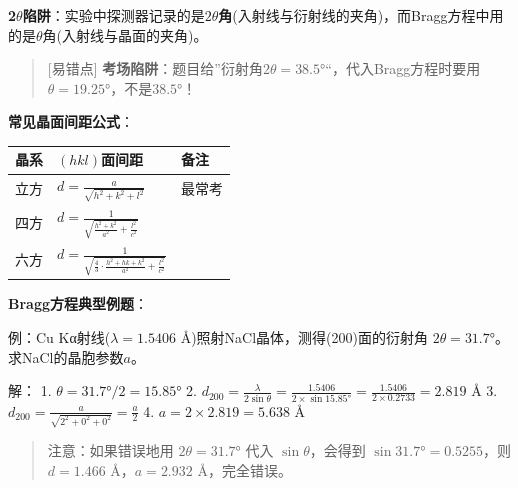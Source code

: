 \textbf{2\(\theta\)陷阱}：实验中探测器记录的是\textbf{\(2\theta\)角}(入射线与衍射线的夹角)，而Bragg方程中用的是\(\theta\)角(入射线与晶面的夹角)。

\begin{quote}
{[}易错点{]} \textbf{考场陷阱}：题目给''衍射角\(2\theta = 38.5°\)``，代入Bragg方程时要用\(\theta = 19.25°\)，不是\(38.5°\)！
\end{quote}

\textbf{常见晶面间距公式}：

{\def\LTcaptype{none} %
\begin{longtable}[]{@{}
  >{\raggedright\arraybackslash}p{}
  >{\raggedright\arraybackslash}p{}
  >{\raggedright\arraybackslash}p{}@{}}
\toprule\noalign{}
\begin{minipage}[b]{\linewidth}\raggedright
晶系
\end{minipage} & \begin{minipage}[b]{\linewidth}\raggedright
\((hkl)\)面间距
\end{minipage} & \begin{minipage}[b]{\linewidth}\raggedright
备注
\end{minipage} \\
\midrule\noalign{}
\endhead
\bottomrule\noalign{}
\endlastfoot
立方 & \(d = \frac{a}{\sqrt{h^2+k^2+l^2}}\) & 最常考 \\
四方 & \(d = \frac{1}{\sqrt{\frac{h^2+k^2}{a^2}+\frac{l^2}{c^2}}}\) & \\
六方 & \(d = \frac{1}{\sqrt{\frac{4}{3}\cdot\frac{h^2+hk+k^2}{a^2}+\frac{l^2}{c^2}}}\) & \\
\end{longtable}
}

\textbf{Bragg方程典型例题}：

例：Cu Kα射线(\(\lambda = 1.5406\) Å)照射NaCl晶体，测得(200)面的衍射角 \(2\theta = 31.7°\)。求NaCl的晶胞参数\(a\)。

解：
1. \(\theta = 31.7° / 2 = 15.85°\)
2. \(d_{200} = \frac{\lambda}{2\sin\theta} = \frac{1.5406}{2 \times \sin 15.85°} = \frac{1.5406}{2 \times 0.2733} = 2.819\) Å
3. \(d_{200} = \frac{a}{\sqrt{2^2+0^2+0^2}} = \frac{a}{2}\)
4. \(a = 2 \times 2.819 = 5.638\) Å

\begin{quote}
注意：如果错误地用 \(2\theta = 31.7°\) 代入 \(\sin\theta\)，会得到 \(\sin 31.7° = 0.5255\)，则 \(d = 1.466\) Å，\(a = 2.932\) Å，完全错误。
\end{quote}


